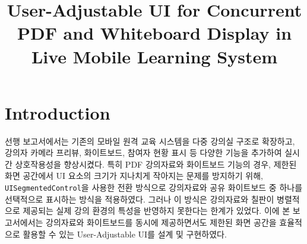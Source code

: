 \documentclass[pdflatex,sn-mathphys-num]{sn-jnl}%
\theoremstyle{thmstyleone}%
\theoremstyle{thmstyletwo}%
\theoremstyle{thmstylethree}%
\begin{document}
\title[Article Title]{User-Adjustable UI for Concurrent PDF and Whiteboard Display in Live Mobile Learning System}


\author{ }








\maketitle

\section{Introduction}\label{sec1}

선행 보고서에서는 기존의 모바일 원격 교육 시스템을 다중 강의실 구조로 확장하고, 강의자 카메라 프리뷰, 화이트보드, 참여자 현황 표시 등 다양한 기능을 추가하여 실시간 상호작용성을 향상시켰다. 특히 PDF 강의자료와 화이트보드 기능의 경우, 제한된 화면 공간에서 UI 요소의 크기가 지나치게 작아지는 문제를 방지하기 위해, \verb+UISegmentedControl+을 사용한 전환 방식으로 강의자료와 공유 화이트보드 중 하나를 선택적으로 표시하는 방식을 적용하였다. 그러나 이 방식은 강의자료와 칠판이 병렬적으로 제공되는 실제 강의 환경의 특성을 반영하지 못한다는 한계가 있었다. 이에 본 보고서에서는 강의자료와 화이트보드를 동시에 제공하면서도 제한된 화면 공간을 효율적으로 활용할 수 있는 User-Adjustable UI를 설계 및 구현하였다.
\end{document}
